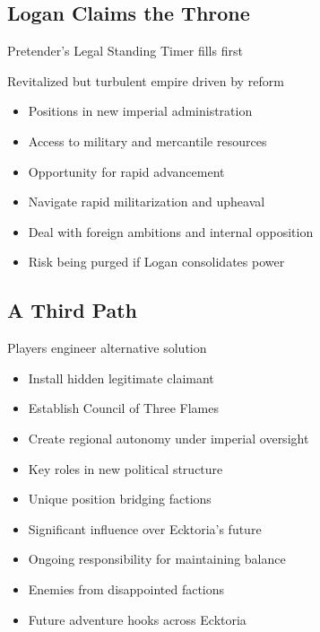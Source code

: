 \documentclass[11pt]{article}
\newenvironment{ending}[1]{\begin{description}[leftmargin=*,style=standard]\item[\textbf{#1}]}{\end{description}}
\begin{document}
\subsection{Logan Claims the Throne}
\begin{ending}{Logan Claims the Throne}
\item[Conditions:] Pretender's Legal Standing Timer fills first
\item[Outcome:] Revitalized but turbulent empire driven by reform
\item[Rewards:] 
  \begin{itemize}
    \item Positions in new imperial administration
    \item Access to military and mercantile resources
    \item Opportunity for rapid advancement
  \end{itemize}
\item[Consequences:] 
  \begin{itemize}
    \item Navigate rapid militarization and upheaval
    \item Deal with foreign ambitions and internal opposition
    \item Risk being purged if Logan consolidates power
  \end{itemize}
\end{ending}

\subsection{A Third Path}
\begin{ending}{A Third Path}
\item[Conditions:] Players engineer alternative solution
\item[Options:] 
  \begin{itemize}
    \item Install hidden legitimate claimant
    \item Establish Council of Three Flames
    \item Create regional autonomy under imperial oversight
  \end{itemize}
\item[Rewards:] 
  \begin{itemize}
    \item Key roles in new political structure
    \item Unique position bridging factions
    \item Significant influence over Ecktoria's future
  \end{itemize}
\item[Consequences:] 
  \begin{itemize}
    \item Ongoing responsibility for maintaining balance
    \item Enemies from disappointed factions
    \item Future adventure hooks across Ecktoria
  \end{itemize}
\end{ending}
\end{document}
